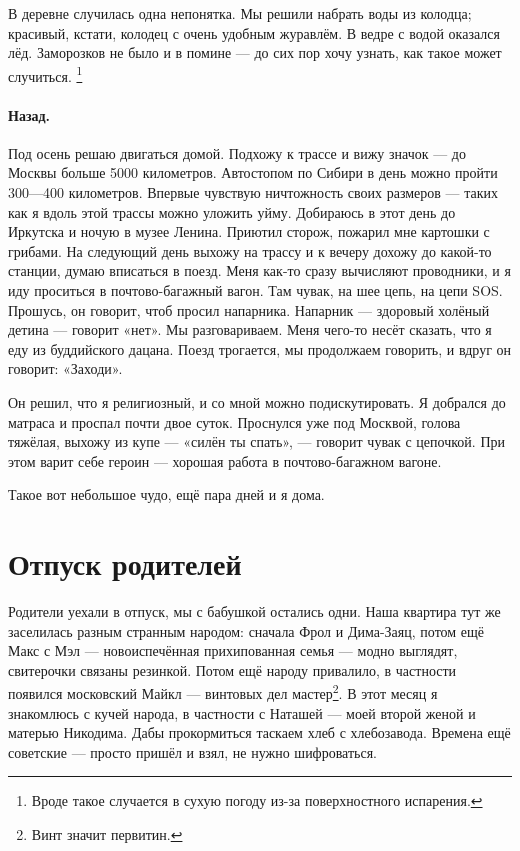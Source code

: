 \documentclass{book}
\begin{document}
В деревне случилась одна непонятка.
Мы решили набрать воды из колодца; красивый, кстати, колодец с очень удобным журавлём.
В ведре с водой оказался лёд.
Заморозков не было и в помине --- до сих пор хочу узнать, как такое может случиться.%
\footnote{Вроде такое случается в сухую погоду из-за поверхностного испарения.}

\paragraph{Назад.}
Под осень решаю двигаться домой.
Подхожу к трассе и вижу значок --- до Москвы больше 5000 километров.
Автостопом по Сибири в день можно пройти 300---400 километров.
Впервые чувствую ничтожность своих размеров --- таких как я вдоль этой трассы можно уложить уйму.
Добираюсь в этот день до Иркутска и ночую в музее Ленина.
Приютил сторож, пожарил мне картошки с грибами.
На следующий день выхожу на трассу и к вечеру дохожу до какой-то станции, думаю вписаться в поезд.
Меня как-то сразу вычисляют проводники, и я иду проситься в почтово-багажный вагон.
Там чувак, на шее цепь, на цепи SOS.
Прошусь, он говорит, чтоб просил напарника.
Напарник --- здоровый холёный детина --- говорит «нет».
Мы разговариваем.
Меня чего-то несёт сказать, что я еду из буддийского дацана.
Поезд трогается, мы продолжаем говорить, и вдруг он говорит: «Заходи».

Он решил, что я религиозный, и со мной можно подискутировать.
Я добрался до матраса и проспал почти двое суток.
Проснулся уже под Москвой, голова тяжёлая, выхожу из купе --- «силён ты спать», --- говорит чувак с цепочкой. 
При этом варит себе героин --- хорошая работа в почтово-багажном вагоне.

Такое вот небольшое чудо, ещё пара дней и я дома.

\section*{Отпуск родителей}

Родители уехали в отпуск, мы с бабушкой остались одни.
Наша квартира тут же заселилась разным странным народом:
сначала Фрол и Дима-Заяц, потом ещё Макс с Мэл --- новоиспечённая прихипованная семья --- модно выглядят, свитерочки связаны резинкой.
Потом ещё народу привалило, в частности появился московский Майкл --- винтовых дел мастер\footnote{Винт значит первитин.}.
В этот месяц я знакомлюсь с кучей народа, в частности с Наташей --- моей второй женой и матерью Никодима.
Дабы прокормиться таскаем хлеб с хлебозавода.
Времена ещё советские --- просто пришёл и взял, не нужно шифроваться.
\end{document}
